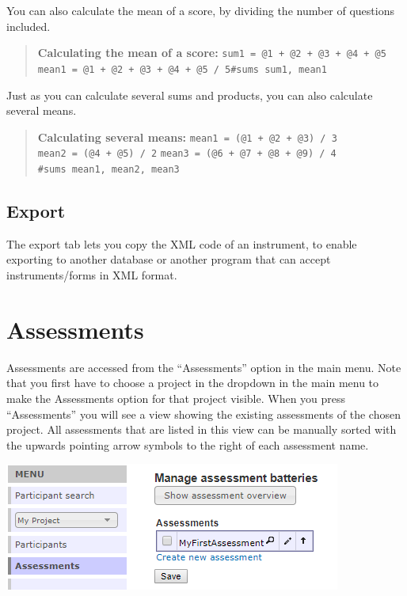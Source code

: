 \documentclass[]{book}
\begin{document}
You can also calculate the mean of a score, by dividing the number of questions included.

\begin{quote}
\textbf{Calculating the mean of a score:} \texttt{sum1\ =\ @1\ +\ @2\ +\ @3\ +\ @4\ +\ @5} \texttt{mean1\ =\ @1\ +\ @2\ +\ @3\ +\ @4\ +\ @5\ /\ 5}\texttt{\#sums\ sum1,\ mean1}
\end{quote}

Just as you can calculate several sums and products, you can also calculate several means.

\begin{quote}
\textbf{Calculating several means:} \texttt{mean1\ =\ (@1\ +\ @2\ +\ @3)\ /\ 3} \texttt{mean2\ =\ (@4\ +\ @5)\ /\ 2} \texttt{mean3\ =\ (@6\ +\ @7\ +\ @8\ +\ @9)\ /\ 4} \texttt{\#sums\ mean1,\ mean2,\ mean3}
\end{quote}

\hypertarget{export}{%
\section{Export}\label{export}}

The export tab lets you copy the XML code of an instrument, to enable exporting to another database or another program that can accept instruments/forms in XML format.

\hypertarget{assessments}{%
\chapter{Assessments}\label{assessments}}

Assessments are accessed from the ``Assessments'' option in the main menu. Note that you first have to choose a project in the dropdown in the main menu to make the Assessments option for that project visible. When you press ``Assessments'' you will see a view showing the existing assessments of the chosen project. All assessments that are listed in this view can be manually sorted with the upwards pointing arrow symbols to the right of each assessment name.

\includegraphics{images/assessement.png}
\end{document}
